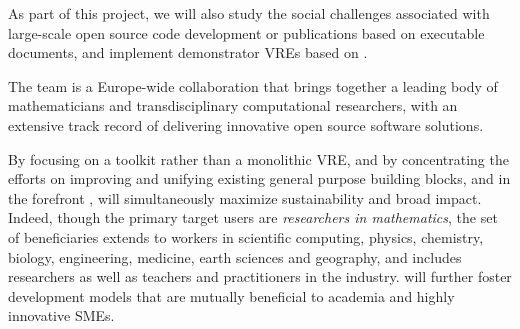 As part of this project, we will also study the social challenges
associated with large-scale open source code development or publications based on executable documents, and implement
demonstrator VREs based on \TheProject.

The \TheProject team is a Europe-wide collaboration that brings
together a leading body of mathematicians and transdisciplinary
computational researchers, with an extensive track record of
delivering innovative open source software solutions.

By focusing on a toolkit rather than a monolithic VRE, and by
concentrating the efforts on improving and unifying existing general
purpose building blocks, and in the forefront \Jupyter, \TheProject
will simultaneously maximize sustainability and broad impact. Indeed,
though the primary target users are \emph{researchers in
  mathematics}, the set of beneficiaries extends to workers in scientific
computing, physics, chemistry, biology, engineering, medicine, earth
sciences and geography, and includes researchers as well as teachers
and practitioners in the industry. \TheProject will further foster
development models that are mutually beneficial to academia and highly
innovative SMEs.






\clearpage


